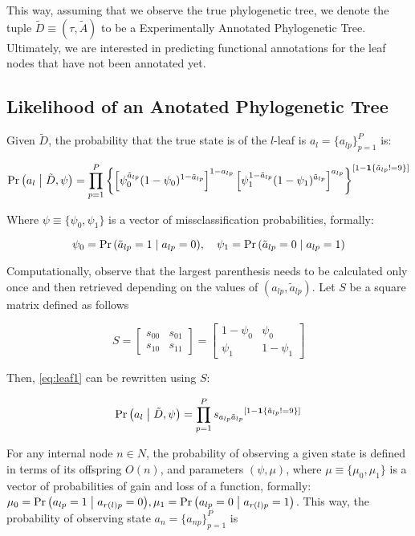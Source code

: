 \documentclass[12pt]{article}
\newcommand{\isone}[1]{{\boldsymbol{1}\left\{ #1 \right\}}}
\newcommand{\Prcond}[2]{{\mbox{Pr}\left(#1\;\vphantom{#2}\right|\left.\vphantom{#1}#2\right) }}
\begin{document}
This way, assuming that we observe the true phylogenetic tree, we denote the tuple $\tilde D\equiv(\tau, \tilde A)$ to be a Experimentally Annotated Phylogenetic Tree. Ultimately, we are interested in predicting functional annotations for the leaf nodes that have not been annotated yet.

\subsection{Likelihood of an Anotated Phylogenetic Tree}

Given $\tilde D$, the probability that the true state is of the $l$-leaf is $a_l = \{a_{lp}\}_{p=1}^P$ is:

\begin{equation}
\label{eq:leaf1}
\Prcond{a_l}{\tilde D, \psi} = \prod_{p = 1}^P\left\{\left[\psi_0^{\tilde a_{lp}}(1-\psi_0)^{1- \tilde a_{lp}}\right]^{1- a_{lp}} \left[\psi_1^{1- \tilde a_{lp}}(1-\psi_1)^{\tilde a_{lp}}\right]^{a_{lp}} \right\}^{\left[1 - \isone{\tilde a_{lp} !=9}\right]}
\end{equation}

Where $\psi\equiv\{\psi_0, \psi_1\}$ is a vector of missclassification probabilities, formally:

$$
\psi_0 = \Prcond{\tilde a_{lp}=1}{a_{lp} = 0},\quad
\psi_1 = \Prcond{\tilde a_{lp}=0}{a_{lp} = 1}
$$

Computationally, observe that the largest parenthesis needs to be calculated only once and then retrieved depending on the values of $(a_{lp},\tilde a_{lp})$. Let $S$ be a square matrix defined as follows

$$
S = \left[\begin{array}{cc}
s_{00} & s_{01} \\
s_{10} & s_{11}
\end{array}\right]
=\left[\begin{array}{cc}
1-\psi_0 & \psi_0 \\
\psi_1 & 1 - \psi_1
\end{array}\right]
$$

Then, \eqref{eq:leaf1} can be rewritten using $S$:

\begin{equation}
\label{eq:leaf2}
\Prcond{a_l}{\tilde D, \psi} = \prod_{p = 1}^P {s_{a_{lp} \tilde a_{lp}}}^{\left[1 - \isone{\tilde a_{lp} !=9}\right]}
\end{equation}

For any internal node $n \in N$, the probability of observing a given state is defined in terms of its offspring $O(n)$, and parameters $(\psi, \mu)$, where $\mu \equiv \{\mu_0,\mu_1\}$ is a vector of probabilities of gain and loss of a function, formally: $
\mu_0 = \Prcond{a_{lp} = 1}{a_{r(l)p} = 0}, \mu_1 = \Prcond{a_{lp} = 0}{a_{r(l)p} = 1}
$. This way, the probability of observing state $a_n = \{a_{np}\}_{p=1}^P$ is
\end{document}
